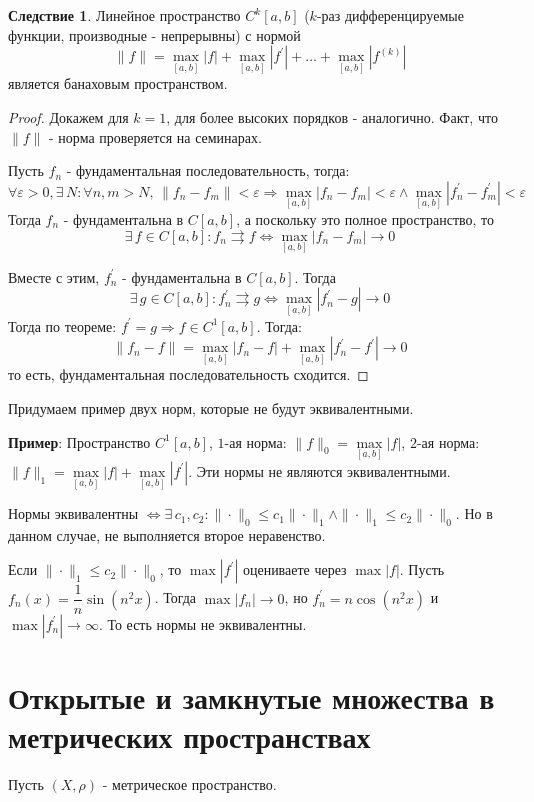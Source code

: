 \documentclass[12pt]{article}
\newcommand{\VE}{\varepsilon}
\theoremstyle{definition}
\newtheorem{corollary}{Следствие}
\begin{document}
\begin{corollary}
	Линейное пространство $C^k[a,b]$ ($k$-раз дифференцируемые функции, производные - непрерывны) с нормой 
	$$
		\|f \| = \max\limits_{[a,b]}|f| + \max\limits_{[a,b]}|f^\prime| + \dotsc + \max\limits_{[a,b]}|f^{(k)}|
	$$ 
	является банаховым пространством.
\end{corollary}
\begin{proof}
	Докажем для $k=1$, для более высоких порядков - аналогично. Факт, что $\|f\|$ - норма проверяется на семинарах.
	
	Пусть $f_n$ - фундаментальная последовательность, тогда:
	$$
		\forall \VE > 0, \exists \, N \colon \forall n,m > N,\, \|f_n -f_m\| < \VE \Rightarrow \max\limits_{[a,b]}|f_n - f_m| < \VE \wedge \max\limits_{[a,b]}|f_n^\prime - f_m^\prime| < \VE
	$$
	Тогда $f_n$ - фундаментальна в $C[a,b]$, а поскольку это полное пространство, то 
	$$
		\exists \, f \in C[a,b] \colon f_n \rightrightarrows f \Leftrightarrow \max\limits_{[a,b]}|f_n - f_m| \to 0
	$$ 
	
	Вместе с этим, $f_n^\prime$ - фундаментальна в $C[a,b]$. Тогда 
	$$ 
		\exists \, g \in C[a,b] \colon f_n^\prime \rightrightarrows g \Leftrightarrow
		\max\limits_{[a,b]}|f_n^\prime - g| \to 0
	$$
	Тогда по теореме: $f^\prime = g \Rightarrow f \in C^1[a,b]$. Тогда:
	$$
		\|f_n - f\| = \max\limits_{[a,b]}{|f_n - f|} + \max\limits_{[a,b]}{|f_n^\prime - f^\prime|} \to 0
	$$
	то есть, фундаментальная последовательность сходится.
\end{proof}
\newpage

Придумаем пример двух норм, которые не будут эквивалентными.

\textbf{Пример}: Пространство $C^1[a,b]$, $1$-ая норма: $\|f\|_0 = \max\limits_{[a,b]}|f|$, $2$-ая норма: $\|f\|_1 = \max\limits_{[a,b]}|f| + \max\limits_{[a,b]}|f^\prime|$. Эти нормы не являются эквивалентными. 

Нормы эквивалентны $\Leftrightarrow \exists \, c_1,c_2\colon \|\cdot\|_0 \leq c_1 \|\cdot\|_1 \wedge \|\cdot\|_1 \leq c_2 \|\cdot\|_0$. Но в данном случае, не выполняется второе неравенство.

Если $\|\cdot\|_1 \leq c_2 \|\cdot\|_0$, то $\max|f^\prime|$ оцениваете через $\max|f|$. Пусть $f_n(x) = \dfrac{1}{n}\sin{(n^2x)}$. Тогда $\max|f_n| \to 0$, но $f_n^\prime = n \cos{(n^2x)}$ и $\max|f_n^\prime| \to \infty$. То есть нормы не эквивалентны.

\section*{Открытые и замкнутые множества в метрических пространствах}
Пусть $(X, \rho)$ - метрическое пространство.
\end{document}
